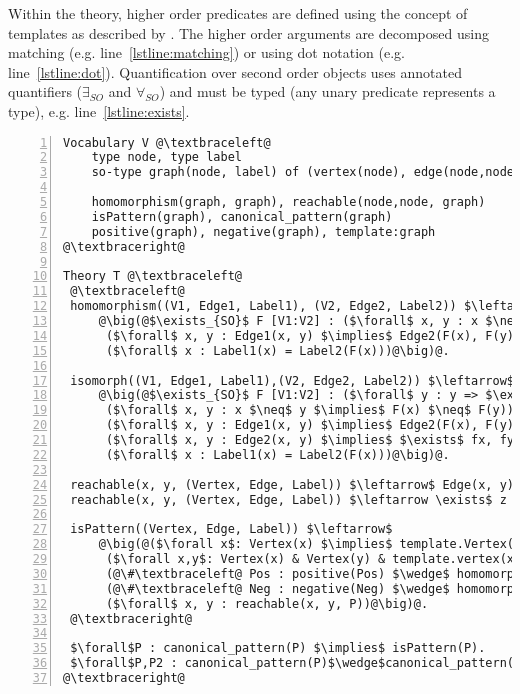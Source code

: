 Within the theory, higher order predicates are defined using the concept of templates as described by \cite{DBLP:journals/tplp/DassevilleHJD15}. %
The higher order arguments are decomposed using matching (e.g. line~\ref{lstline:matching}) or using dot notation (e.g. line~\ref{lstline:dot}).
Quantification over second order objects uses annotated quantifiers ($\exists_{SO}$ and $\forall_{SO}$) and must be typed (any unary predicate represents a type), e.g. line~\ref{lstline:exists}.

\begin{lstlisting}[mathescape,style=model,caption={Faithful encoding},label=lst:faithful, numbers=left]
Vocabulary V @\textbraceleft@
    type node, type label
    so-type graph(node, label) of (vertex(node), edge(node,node), label(node):label)
    
    homomorphism(graph, graph), reachable(node,node, graph)
    isPattern(graph), canonical_pattern(graph)
    positive(graph), negative(graph), template:graph 
@\textbraceright@ 

Theory T @\textbraceleft@ 
 @\textbraceleft@
 homomorphism((V1, Edge1, Label1), (V2, Edge2, Label2)) $\leftarrow$@\label{lstline:matching}@
     @\big(@$\exists_{SO}$ F [V1:V2] : ($\forall$ x, y : x $\neq$ y $\implies$ F(x) $\neq$ F(y)) $\wedge$@\label{lstline:exists}@
      ($\forall$ x, y : Edge1(x, y) $\implies$ Edge2(F(x), F(y))) $\wedge$
      ($\forall$ x : Label1(x) = Label2(F(x)))@\big)@.

 isomorph((V1, Edge1, Label1),(V2, Edge2, Label2)) $\leftarrow$
     @\big(@$\exists_{SO}$ F [V1:V2] : ($\forall$ y : y => $\exists$ x : F(x)=y) $\land$ 
      ($\forall$ x, y : x $\neq$ y $\implies$ F(x) $\neq$ F(y)) $\wedge$
      ($\forall$ x, y : Edge1(x, y) $\implies$ Edge2(F(x), F(y))) $\wedge$              
      ($\forall$ x, y : Edge2(x, y) $\implies$ $\exists$ fx, fy : Edge1(fx, fy) $\land$ x = F(fx) $\land$ y = F(fy)) $\wedge$
      ($\forall$ x : Label1(x) = Label2(F(x)))@\big)@.

 reachable(x, y, (Vertex, Edge, Label)) $\leftarrow$ Edge(x, y) $\lor$ Edge(y, x).
 reachable(x, y, (Vertex, Edge, Label)) $\leftarrow \exists$ z : reachable(x, z, (Edge, Label)) $\wedge$ reachable(z, y, (Edge, Label)).

 isPattern((Vertex, Edge, Label)) $\leftarrow$
     @\big(@($\forall x$: Vertex(x) $\implies$ template.Vertex(x)) $\land$@\label{lstline:dot}@
      ($\forall x,y$: Vertex(x) & Vertex(y) & template.vertex(x) & template.vertex(y) & template.Edge(x,y) $\implies$ Edge(x,y)) $\land$ 
      (@\#\textbraceleft@ Pos : positive(Pos) $\wedge$ homomorphism(P, Pos) @\textbraceright@ $\geq$ $N_{+}$) $\land$
      (@\#\textbraceleft@ Neg : negative(Neg) $\wedge$ homomorphism(P, Neg) @\textbraceright@ $\leq$ $N_{-}$) $\land$
      ($\forall$ x, y : reachable(x, y, P))@\big)@.
 @\textbraceright@
      
 $\forall$P : canonical_pattern(P) $\implies$ isPattern(P). 
 $\forall$P,P2 : canonical_pattern(P)$\wedge$canonical_pattern(P2)$\wedge$P$\neq$P2 $\implies$ $\neg$isomorph(P, P2).
@\textbraceright@ 
\end{lstlisting}

